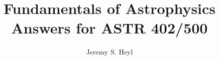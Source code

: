 \documentclass[10pt]{article}
\begin{document}
\title{Fundamentals of Astrophysics\\{\large Answers for ASTR 402/500}}
\author{Jeremy S. Heyl}
\maketitle










\end{document}
